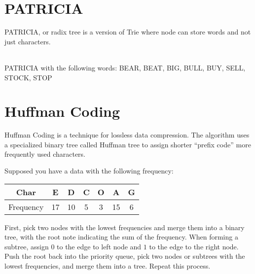 \section{PATRICIA}

PATRICIA, or radix tree is a version of Trie where node can store words and not just characters.

\begin{center}
  \\
  PATRICIA with the following words: { BEAR, BEAT, BIG, BULL, BUY, SELL, STOCK, STOP }
\end{center}

\section{Huffman Coding}

Huffman Coding is a technique for lossless data compression.
The algorithm uses a specialized binary tree called Huffman tree to assign shorter ``prefix code'' more frequently used characters.

\noindent Supposed you have a data with the following frequency:
\begin{center}
  \begin{tabular}{ |c||c|c|c|c|c|c| }
    \hline
    Char & E & D & C & O & A & G\\
    \hline
    Frequency & 17 & 10 & 5 & 3 & 15 & 6\\
    \hline
  \end{tabular}
\end{center}

\noindent First, pick two nodes with the lowest frequencies and merge them into a binary tree, with the root note indicating the sum of the frequency.
When forming a subtree, assign $0$ to the edge to left node and $1$ to the edge to the right node.
Push the root back into the priority queue, pick two nodes or subtrees with the lowest frequencies, and merge them into a tree.
Repeat this process.

